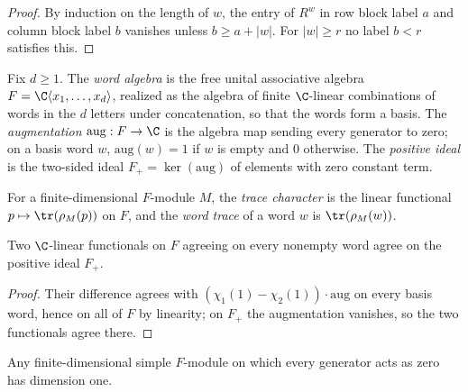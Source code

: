 \begin{proof}
    \leanok
    By induction on the length of $w$, the entry of $R^w$ in row block label
    $a$ and column block label $b$ vanishes unless $b\ge a+|w|$. For
    $|w|\ge r$ no label $b<r$ satisfies this.
\end{proof}

\begin{definition}
    \label{def:asym_word_algebra}
    \leanok
    Fix $d\geq1$. The \emph{word algebra} is the free unital associative
    algebra $F=\C\langle x_1,\ldots,x_d\rangle$, realized as the algebra of
    finite $\C$-linear combinations of words in the $d$ letters under
    concatenation, so that the words form a basis. The \emph{augmentation}
    $\mathrm{aug}:F\to\C$ is the algebra map sending every generator to
    zero; on a basis word $w$, $\mathrm{aug}(w)=1$ if $w$ is empty and $0$
    otherwise. The \emph{positive ideal} is the two-sided ideal
    $F_+=\ker(\mathrm{aug})$ of elements with zero constant term.
\end{definition}

\begin{definition}
    \label{def:asym_word_traces}
    \leanok
    For a finite-dimensional $F$-module $M$, the \emph{trace character} is
    the linear functional $p\mapsto\tr(\rho_M(p))$ on $F$, and the
    \emph{word trace} of a word $w$ is $\tr(\rho_M(w))$.
\end{definition}

\begin{lemma}
    \label{lem:asym_ker_aug_separation}
    \leanok
    Two $\C$-linear functionals on $F$ agreeing on every nonempty word
    agree on the positive ideal $F_+$.
\end{lemma}

\begin{proof}
    \leanok
    Their difference agrees with $(\chi_1(1)-\chi_2(1))\cdot\mathrm{aug}$ on
    every basis word, hence on all of $F$ by linearity; on $F_+$ the
    augmentation vanishes, so the two functionals agree there.
\end{proof}

\begin{lemma}
    \label{lem:asym_zero_module}
    \leanok
    Any finite-dimensional simple $F$-module on which every generator acts as
    zero has dimension one.
\end{lemma}

